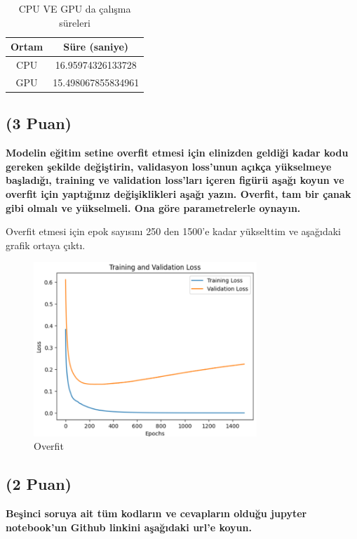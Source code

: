 \documentclass[11pt]{article}
\begin{document}
\begin{table}[ht!]
    \centering
    \caption{CPU VE GPU da çalışma süreleri}
    \begin{tabular}{c|c}
        Ortam & Süre (saniye) \\\hline
        CPU & 16.95974326133728 \\
        GPU & 15.498067855834961\\
    \end{tabular}
    \label{tab:my_table}
\end{table}

\subsection{(3 Puan)} \textbf{Modelin eğitim setine overfit etmesi için elinizden geldiği kadar kodu gereken şekilde değiştirin, validasyon loss'unun açıkça yükselmeye başladığı, training ve validation loss'ları içeren figürü aşağı koyun ve overfit için yaptığınız değişiklikleri aşağı yazın. Overfit, tam bir çanak gibi olmalı ve yükselmeli. Ona göre parametrelerle oynayın.}

{Overfit etmesi için epok sayısını 250 den 1500'e kadar yükselttim ve aşağıdaki grafik ortaya çıktı.}

\begin{figure}[ht!]
   
    \includegraphics[width=0.75\textwidth]{overfit.PNG}
    \caption{Overfit}
    \label{fig:my_pic2}
\end{figure}





\subsection{(2 Puan)} \textbf{Beşinci soruya ait tüm kodların ve cevapların olduğu jupyter notebook'un Github linkini aşağıdaki url'e koyun.}
\end{document}
